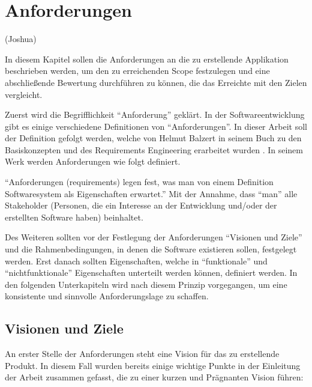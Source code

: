 \chapter{Anforderungen}

(Joshua)

In diesem Kapitel sollen die Anforderungen an die zu erstellende Applikation beschrieben werden, um den zu erreichenden Scope festzulegen und eine abschließende Bewertung durchführen zu können, die das Erreichte mit den Zielen vergleicht.

\vspace{0.25cm}

Zuerst wird die Begrifflichkeit \enquote{Anforderung} geklärt. In der Softwareentwicklung gibt es einige verschiedene Definitionen von \enquote{Anforderungen}. In dieser Arbeit soll der Definition gefolgt werden, welche von Helmut Balzert in seinem Buch zu den Basiskonzepten und des Requirements Engineering erarbeitet wurden \cite{Balzert.2009}. In seinem Werk werden Anforderungen wie folgt definiert.

\begin{defStrich}[Anforderungen]
	\enquote{Anforderungen (requirements) legen fest, was man von einem Definition
		Softwaresystem als Eigenschaften erwartet.} Mit der Annahme, dass \enquote{man} alle Stakeholder (Personen, die ein Interesse an der Entwicklung und/oder der erstellten Software haben) beinhaltet. \cite{Balzert.2009}
\end{defStrich} 

Des Weiteren sollten vor der Festlegung der Anforderungen \enquote{Visionen und Ziele} und die Rahmenbedingungen, in denen die Software existieren sollen, festgelegt werden. Erst danach sollten Eigenschaften, welche in \enquote{funktionale} und \enquote{nichtfunktionale} Eigenschaften unterteilt werden können, definiert werden. In den folgenden Unterkapiteln wird nach diesem Prinzip vorgegangen, um eine konsistente und sinnvolle Anforderungslage zu schaffen.

\section{Visionen und Ziele}
An erster Stelle der Anforderungen steht eine Vision für das zu erstellende Produkt. In diesem Fall wurden bereits einige wichtige Punkte in der Einleitung der Arbeit zusammen gefasst, die zu einer kurzen und Prägnanten Vision führen:

\vspace{0.25cm}

